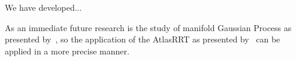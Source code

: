 We have developed...

As an immediate future research is the study of manifold Gaussian Process as presented by~\citet{Calandra2014Manifold}, so the application of the AtlasRRT as presented by~\citet{Jaillet2013Path} can be applied in a more precise manner.

